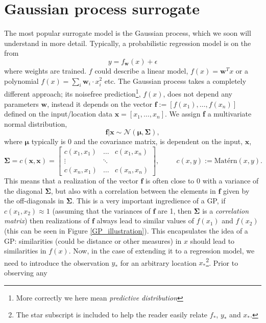 \section{Gaussian process surrogate}

The most popular surrogate model is the Gaussian process, which we soon will understand
in more detail. Typically, a probabilistic regression model is on the from 
$$y = f_{\textbf{w}}(x) + \epsilon$$
where weights are trained. $f$ could describe a linear model, $f(x) = \textbf{w}^Tx$ or a polynomial
$f(x) = \sum_i\textbf{w}_i\cdot x_i^2$ etc. %
The Gaussian process takes a completely different approach; its noisefree prediction\footnote{More
correctly we here mean \textit{predictive distribution}}, $f(x)$, does not depend any parameters
$\textbf{w}$, instead it depends on the vector $\textbf{f} := [f(x_1),\dots,f(x_n)]$ defined on the
input/location data $\textbf{x} = [x_1, \dots, x_n]$. We assign \textbf{f} a multivariate normal distribution, 
$$\textbf{f}|\textbf{x} \sim \mathcal{N}(\bm{\mu}, \bm{\Sigma}),$$
where $\bm{\mu}$ typically is $0$ and the covariance matrix, is dependent on the input, $\textbf{x}$, 
 $$\bm{\Sigma} = c(\textbf{x}, \textbf{x}) = \begin{bmatrix}
    c(x_1,x_1) & \dots & c(x_1,x_n)\\
    \vdots& \ddots\\
    c(x_n,x_1) & \dots & c(x_n,x_n) \end{bmatrix},\hspace{1cm} c(x, y) := \text{Matérn}(x,y).$$ 
    This means that a realization of the vector $\textbf{f}$ is often close to 0 with a variance of the
    diagonal $\bm{\Sigma}$, but also with a correlation between the elements in $\textbf{f}$ given
    by the off-diagonals in $\bm{\Sigma}$. This is a very important ingredience of a GP, if
    $c(x_1,x_2) \approx 1$ (assuming that the variances of $\textbf{f}$ are 1, then $\bm{\Sigma}$ is
    a \textit{correlation matrix}) then realizations of $\textbf{f}$ always lead to similar values
    of $f(x_1)$ and $f(x_2)$ (this can be seen in Figure \ref{GP_illustration}). This encapsulates
    the idea of a GP: similarities (could be distance or other measures) in $x$ should lead to
    similarities in $f(x)$. Now, in the case of extending it to a regression model, we need to
    introduce the observation $y_*$ for an arbitrary location $x_*$\footnote{The star subscript is
    included to help the reader easily relate $f_*$, $y_*$ and $x_*$.}. Prior to observing any
